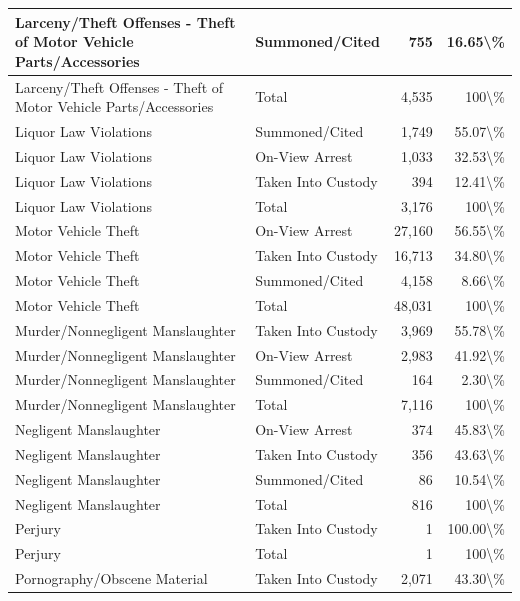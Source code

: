 \documentclass[
]{krantz}
\begin{document}
\begin{longtable}[t]{l|l|r|r}
\hline
Larceny/Theft Offenses - Theft of Motor Vehicle Parts/Accessories & Summoned/Cited & 755 & 16.65\textbackslash{}\%\\
\hline
Larceny/Theft Offenses - Theft of Motor Vehicle Parts/Accessories & Total & 4,535 & 100\textbackslash{}\%\\
\hline
Liquor Law Violations & Summoned/Cited & 1,749 & 55.07\textbackslash{}\%\\
\hline
Liquor Law Violations & On-View Arrest & 1,033 & 32.53\textbackslash{}\%\\
\hline
Liquor Law Violations & Taken Into Custody & 394 & 12.41\textbackslash{}\%\\
\hline
Liquor Law Violations & Total & 3,176 & 100\textbackslash{}\%\\
\hline
Motor Vehicle Theft & On-View Arrest & 27,160 & 56.55\textbackslash{}\%\\
\hline
Motor Vehicle Theft & Taken Into Custody & 16,713 & 34.80\textbackslash{}\%\\
\hline
Motor Vehicle Theft & Summoned/Cited & 4,158 & 8.66\textbackslash{}\%\\
\hline
Motor Vehicle Theft & Total & 48,031 & 100\textbackslash{}\%\\
\hline
Murder/Nonnegligent Manslaughter & Taken Into Custody & 3,969 & 55.78\textbackslash{}\%\\
\hline
Murder/Nonnegligent Manslaughter & On-View Arrest & 2,983 & 41.92\textbackslash{}\%\\
\hline
Murder/Nonnegligent Manslaughter & Summoned/Cited & 164 & 2.30\textbackslash{}\%\\
\hline
Murder/Nonnegligent Manslaughter & Total & 7,116 & 100\textbackslash{}\%\\
\hline
Negligent Manslaughter & On-View Arrest & 374 & 45.83\textbackslash{}\%\\
\hline
Negligent Manslaughter & Taken Into Custody & 356 & 43.63\textbackslash{}\%\\
\hline
Negligent Manslaughter & Summoned/Cited & 86 & 10.54\textbackslash{}\%\\
\hline
Negligent Manslaughter & Total & 816 & 100\textbackslash{}\%\\
\hline
Perjury & Taken Into Custody & 1 & 100.00\textbackslash{}\%\\
\hline
Perjury & Total & 1 & 100\textbackslash{}\%\\
\hline
Pornography/Obscene Material & Taken Into Custody & 2,071 & 43.30\textbackslash{}\%\\

\end{longtable}
\end{document}
